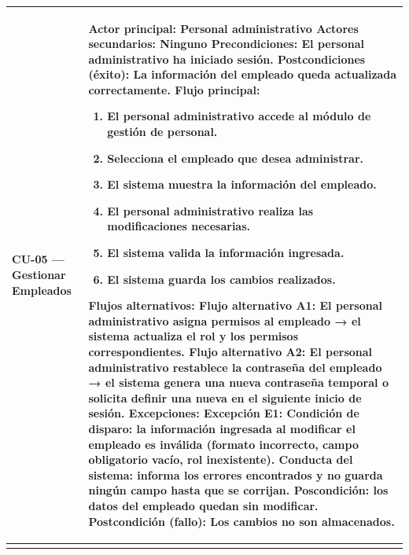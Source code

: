 \documentclass[
]{article}
\newcounter{none} %
\begin{document}
{\def\LTcaptype{none} %
\begin{longtable}[]{|
  >{\raggedright\arraybackslash}p{}|
  >{\raggedright\arraybackslash}p{}|}
\hline
\begin{minipage}[b]{\linewidth}\raggedright
\textbf{CU-05 --- Gestionar Empleados}
\end{minipage} & \begin{minipage}[b]{\linewidth}\raggedright
\textbf{Actor principal:} Personal administrativo \textbf{Actores secundarios:}
Ninguno \textbf{Precondiciones:} El personal administrativo ha iniciado sesión. \textbf{Postcondiciones (éxito):} La información del empleado queda
actualizada correctamente. \textbf{Flujo principal:}

\begin{enumerate}
\def\labelenumi{\arabic{enumi}.}
\item
  El personal administrativo accede al módulo de gestión de personal.
\item
  Selecciona el empleado que desea administrar.
\item
  El sistema muestra la información del empleado.
\item
  El personal administrativo realiza las modificaciones necesarias.
\item
  El sistema valida la información ingresada.
\item
  El sistema guarda los cambios realizados.
\end{enumerate}

\textbf{Flujos alternativos:} Flujo alternativo A1: El personal administrativo asigna permisos al empleado → el sistema actualiza el rol y los permisos correspondientes. Flujo alternativo A2: El personal administrativo restablece la contraseña del empleado → el sistema genera una nueva contraseña temporal o solicita definir una nueva en el siguiente inicio de sesión.
\textbf{Excepciones:} Excepción E1: Condición de disparo: la información ingresada al modificar el empleado es inválida (formato incorrecto, campo obligatorio vacío, rol inexistente). Conducta del sistema: informa los errores encontrados y no guarda ningún campo hasta que se corrijan. Poscondición: los datos del empleado quedan sin modificar.
\textbf{Postcondición (fallo):} Los cambios no son almacenados.
\end{minipage} \\
\hline
\endhead
\hline
\endlastfoot
\end{longtable}
}
\end{document}
